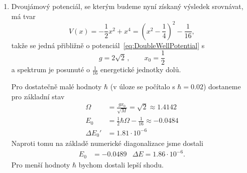 \begin{solution}
\begin{enumerate}
	\item
		Dvoujámový potenciál, se kterým budeme nyní získaný výsledek srovnávat, má tvar
		\begin{equation}
			V(x)=-\frac{1}{2}x^{2}+x^{4}=\left(x^{2}-\frac{1}{4}\right)^{2}-\frac{1}{16},
		\end{equation}
		takže se jedná přibližně o potenciál~\eqref{eq:DoubleWellPotential} s
		\begin{equation}
			g=2\sqrt{2}\,,\qquad x_{0}=\frac{1}{2}
		\end{equation}
		a spektrum je posunuté o $\frac{1}{16}$ energetické jednotky dolů.
		
		Pro dostatečně malé hodnoty $\hbar$ (v úloze se počítalo s $\hbar=0.02$) dostaneme pro základní stav
		\begin{align}
			\Omega&=\frac{g x_{0}}{\sqrt{M}}=\sqrt{2}\approx1.4142\nonumber\\
			E_{0}&=\frac{1}{2}\hbar\Omega-\frac{1}{16}\approx-0.0484\nonumber\\
			\Delta E_{0}'&=1.81\cdot 10^{-6}
		\end{align}
		Naproti tomu na základě numerické diagonalizace jsme dostali
		\begin{align}
			E_{0}&=-0.0489 & \Delta E=1.86\cdot 10^{-6}.
		\end{align}
		Pro menší hodnoty $\hbar$ bychom dostali lepší shodu.						
	\end{enumerate}
\end{solution}
	
